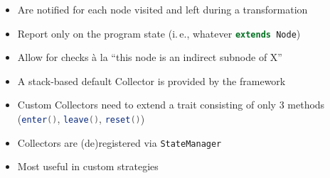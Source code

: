 \documentclass{article}
\begin{document}
\begin{itemize}
 \item Are notified for each node visited and left during a transformation
 \item Report only on the program state (i.\,e., whatever \lstinline[language=scala]{extends Node})
 \item Allow for checks \`a la ``this node is an indirect subnode of X''
 \item A stack-based default Collector is provided by the framework
 \item Custom Collectors need to extend a trait consisting of only 3 methods (\lstinline[language=scala]{enter()}, \lstinline[language=scala]{leave()}, \lstinline[language=scala]{reset()})
 \item Collectors are (de)registered via \lstinline[language=scala]{StateManager}
 \item Most useful in custom strategies
\end{itemize}
\end{document}
